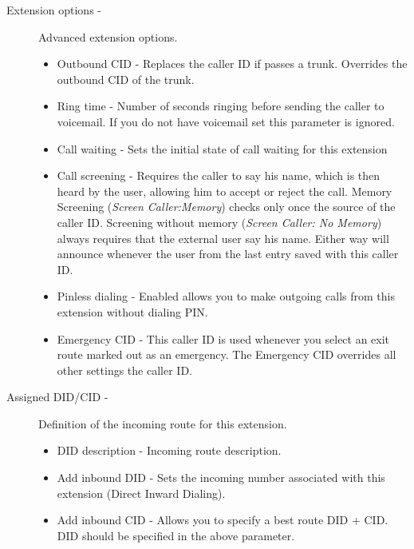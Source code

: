 \begin{description}
\begin{description}
            \item[Extension options -] Advanced extension options.
                \begin{itemize}
                    \item Outbound CID - Replaces the caller ID if passes a trunk. Overrides the outbound CID of the trunk.
                    \item Ring time - Number of seconds ringing before sending the caller to voicemail. If you do not have voicemail set this parameter is ignored.
                    \item Call waiting - Sets the initial state of call waiting for this extension 
                    \item Call screening - Requires the caller to say his name, which is then heard by the user, allowing him to accept or reject the call. Memory Screening (\emph{Screen Caller:Memory}) checks only once the source of the caller ID. Screening without memory (\emph{Screen Caller: No Memory}) always requires that the external user say his name. Either way will announce whenever the user from the last entry saved with this caller ID.
                    \item Pinless dialing - Enabled allows you to make outgoing calls from this extension without dialing PIN.
                    \item Emergency CID - This caller ID is used whenever you select an exit route marked out as an emergency. The Emergency CID overrides all other settings the caller ID.
                \end{itemize}

            \item[Assigned DID/CID -] Definition of the incoming route for this extension.
                \begin{itemize}
                    \item DID description - Incoming route description.
                    \item Add inbound DID - Sets the incoming number associated with this extension (Direct Inward Dialing).
                    \item Add inbound CID - Allows you to specify a best route DID + CID. DID should be specified in the above parameter.
                \end{itemize}


\end{description}
\end{description}
